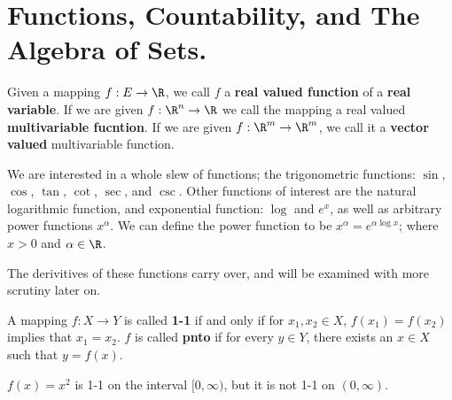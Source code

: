 
\section{Functions, Countability, and The Algebra of Sets.}

\begin{definition}
   Given a mapping $f:E \rightarrow \R$, we call $f$ a \textbf{real valued function} of a \textbf{real variable}. If we are 
   given $f:\R^n \rightarrow \R$ we call the mapping a  real valued \textbf{multivariable fucntion}. If we are given 
   $f:\R^m \rightarrow \R^m$, we call it a \textbf{vector valued} multivariable function.
\end{definition}

We are interested in a whole slew of functions; the trigonometric functions: $\sin$, $\cos$, $\tan$, $\cot$, $\sec$, and 
$\csc$. Other functions of interest are the natural logarithmic function, and exponential function: $\log$ and $e^x$, as 
well as arbitrary power functions $x^{\alpha}$. We can define the power function to be $x^{\alpha}=e^{\alpha \log{x}}$; 
where $x>0$ and $\alpha \in \R$.

The derivitives of these functions carry over, and will be examined with more scrutiny later on.

\begin{definition}
  A mapping $f:X \rightarrow Y$ is called \textbf{1-1} if and only if for $x_1,x_2 \in X$, $f(x_1)=f(x_2)$ implies that 
  $x_1=x_2$. $f$ is called \textbf{pnto} if for every $y \in Y$, there exists an $x \in X$ such that $y=f(x)$.
\end{definition}

\begin{example}
  $f(x)=x^2$ is 1-1 on the interval $[0,\infty)$, but it is not 1-1 on $(0,\infty)$.
\end{example}

